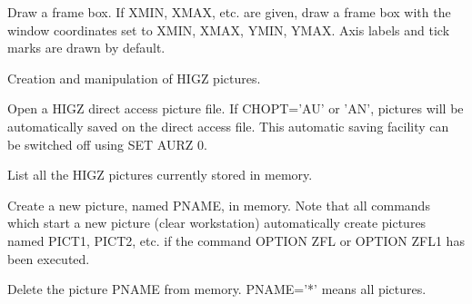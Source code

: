    \par
Draw a frame box.  If XMIN, XMAX, etc. are given, draw a frame box with the 
   window coordinates set to XMIN, XMAX, YMIN, YMAX. Axis labels and tick 
   marks are drawn by default.  

\ENDCMD
{}
\ifMENUtext
   \par
Creation and manipulation of HIGZ pictures.  


\fi


\BEGARG
{}
\ENDARG
{}
\ENDOPT

   \par
Open a HIGZ direct access picture file.  If CHOPT='AU' or 'AN', pictures 
   will be automatically saved on the direct access file. This automatic 
   saving facility can be switched off using SET AURZ 0.  

\ENDCMD


   \par
List all the HIGZ pictures currently stored in memory.  

\ENDCMD


\BEGARG
{}
\ENDARG

   \par
Create a new picture, named PNAME, in memory.  Note that all commands which 
   start a new picture (clear workstation) automatically create pictures named 
   PICT1, PICT2, etc.  if the command OPTION ZFL or OPTION ZFL1 has been 
   executed.  

\ENDCMD


\BEGARG
{}
\ENDARG

   \par
Delete the picture PNAME from memory.  PNAME='*' means all pictures.  

